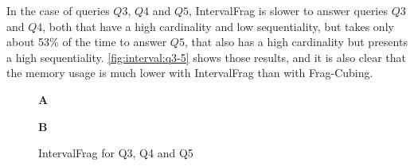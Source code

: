 In the case of queries $Q3$, $Q4$ and $Q5$, IntervalFrag is slower to answer queries $Q3$ and $Q4$, both that have a high cardinality and low sequentiality, but takes only about 53\% of the time to answer $Q5$, that also has a high cardinality but presents a high sequentiality.
\autoref{fig:interval:q3-5} shows those results, and it is also clear that the memory usage is much lower with IntervalFrag than with Frag-Cubing.

\begin{figure}[H]
  \caption{IntervalFrag for Q3, Q4 and Q5}\label{fig:interval:q3-5}
  \vspace{6mm}
  \begin{center}
    \begin{minipage}{0.5\textwidth}
        \textbf{A}
        \centering
    \end{minipage}\hfill
    \begin{minipage}{0.5\textwidth}
        \textbf{B}
        \centering
    \end{minipage}
  \end{center}
  \vspace{2mm}
\end{figure}

